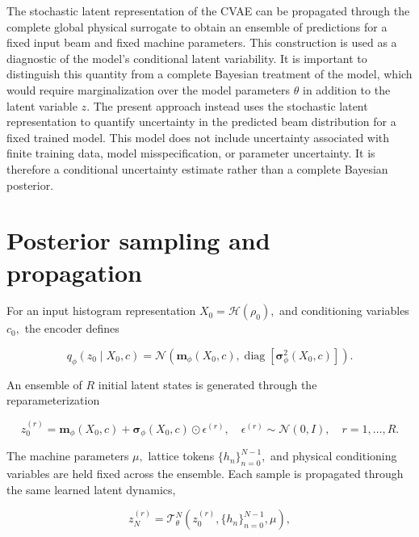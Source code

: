 The stochastic latent representation of the CVAE can be propagated through the complete global physical surrogate to obtain an ensemble of predictions for a fixed input beam and fixed machine parameters. This construction is used as a diagnostic of the model’s conditional latent variability. It is important to distinguish this quantity from a complete Bayesian treatment of the model, which would require marginalization over the model parameters \(\theta\) in addition to the latent variable \(z .\) The present approach instead uses the stochastic latent representation to quantify uncertainty in the predicted beam distribution for a fixed trained model. This model does not include uncertainty associated with finite training data, model misspecification, or parameter uncertainty. It is therefore a conditional uncertainty estimate rather than a complete Bayesian posterior.

\section{Posterior sampling and propagation}
\label{sec:04_machine_learning_methodology_posterior_sampling_and_propagation}

For an input histogram representation \(X_{0} = \mathcal{H} ( \rho_{0} ) ,\) and conditioning variables \(c_{0} ,\) the encoder defines

\begin{equation}
\label{eq:162}
q_{\phi}(z_0\mid X_0,c)=\mathcal N\left(\mathbf m_{\phi}(X_0,c),\operatorname{diag}[\boldsymbol\sigma_{\phi}^{2}(X_0,c)]\right).
\end{equation}

An ensemble of \(R\) initial latent states is generated through the reparameterization

\begin{equation}
\label{eq:163}
z_0^{(r)}=\mathbf m_{\phi}(X_0,c)+\boldsymbol\sigma_{\phi}(X_0,c)\odot\epsilon^{(r)},\quad\epsilon^{(r)}\sim\mathcal N(0,I),\quad r=1,\ldots,R.
\end{equation}

The machine parameters \(\mu ,\) lattice tokens \(\{ h_{n} \}_{n = 0}^{N - 1} ,\) and physical conditioning variables are held fixed across the ensemble. Each sample is propagated through the same learned latent dynamics,

\begin{equation}
\label{eq:164}
z_N^{(r)}=\mathcal T_{\theta}^{N}\left(z_0^{(r)},\{h_n\}_{n=0}^{N-1},\mu\right),
\end{equation}


